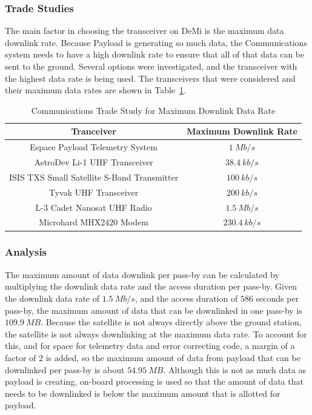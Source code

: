 \documentclass[12pt]{article}
\begin{document}
\subsubsection{Trade Studies} \label{sec:communications-trade-studies}

The main factor in choosing the transceiver on DeMi is the maximum data downlink rate. Because Payload is generating so much data, the Communications system needs to have a high downlink rate to ensure that all of that data can be sent to the ground. Several options were investigated, and the transceiver with the highest data rate is being used. The transceivers that were considered and their maximum data rates are shown in Table~\ref{table:comm_transceivers}.

\begin{table}[ht]
\caption{Communications Trade Study for Maximum Downlink Data Rate}
\begin{center}
    \begin{tabular}{| c | c |} \hline
    	\textbf{Tranceiver} & \textbf{Maximum Downlink Rate} \\ \hline \hline
Espace Payload Telemetry System & $1\ Mb/s$ \\
AstroDev Li-1 UHF Transceiver & $38.4\ kb/s$ \\
ISIS TXS Small Satellite  S-Band Transmitter & $100\ kb/s$ \\
Tyvak UHF Transceiver & $200\ kb/s$ \\
L-3 Cadet Nanosat UHF Radio & $1.5\ Mb/s$ \\
Microhard MHX2420 Modem & $230.4\ kb/s$ \\ \hline 
    \end{tabular}\label{table:comm_transceivers}
\end{center}
\end{table}

			\subsubsection{Analysis}

The maximum amount of data downlink per pass-by can be calculated by multiplying the downlink data rate and the access duration per pass-by. Given the downlink data rate of $1.5\ Mb/s$, and the access duration of $586$ seconds per pass-by, the maximum amount of data that can be downlinked in one pass-by is $109.9\ MB$. Because the satellite is not always directly above the ground station, the satellite is not always downlinking at the maximum data rate. To account for this, and for space for telemetry data and error correcting code, a margin of a factor of 2 is added, so the maximum amount of data from payload that can be downlinked per pass-by is about $54.95\ MB$. Although this is not as much data as payload is creating, on-board processing is used so that the amount of data that needs to be downlinked is below the maximum amount that is allotted for payload.
\end{document}
